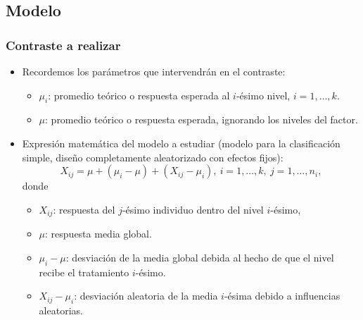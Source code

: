 \subsection{Modelo}
\begin{frame}
\frametitle{Contraste a realizar}
\begin{itemize}
\item<2-> Recordemos los parámetros que intervendrán en el contraste:
\begin{itemize}
\item<3-> $\mu_i$: promedio teórico o respuesta esperada al $i$-ésimo nivel, $i=1,\ldots,k$.
\item<4-> $\mu$: promedio teórico o respuesta esperada, ignorando los niveles del factor.
\end{itemize}
\item<5-> Expresión matemática del modelo a estudiar (modelo para la clasificación simple, diseño completamente aleatorizado con efectos fijos):
\[
X_{ij} = \mu + (\mu_i - \mu)+ (X_{ij} -\mu_i),\ i=1,\ldots,k,\ j=1,\ldots,n_i,
\]
donde
\begin{itemize}
\item<6-> $X_{ij}$: respuesta del $j$-ésimo individuo dentro del nivel $i$-ésimo,
\item<7-> $\mu$: respuesta media global.
\item<8-> $\mu_i -\mu$: desviación de la media global debida al hecho de que el nivel recibe el tratamiento $i$-ésimo.
\item<9-> $X_{ij}-\mu_i$: desviación aleatoria de la media $i$-ésima debido a influencias aleatorias.
\end{itemize}
\end{itemize}
\end{frame}


